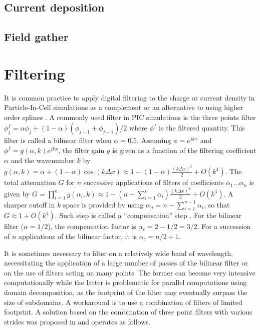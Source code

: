 \documentclass[]{report}
\begin{document}
\subsection{Current deposition}


\subsection{Field gather}


\section{Filtering}

It is common practice to apply digital filtering to the charge or
current density in Particle-In-Cell simulations as a complement or
an alternative to using higher order splines \cite{Birdsalllangdon}.
A commonly used filter in PIC simulations is the three points filter
$\phi_{j}^{f}=\alpha\phi_{j}+\left(1-\alpha\right)\left(\phi_{j-1}+\phi_{j+1}\right)/2$
where $\phi^{f}$ is the filtered quantity. This filter is called
a bilinear filter when $\alpha=0.5$. Assuming $\phi=e^{jkx}$ and
$\phi^{f}=g\left(\alpha,k\right)e^{jkx}$, the filter gain $g$ is
given as a function of the filtering coefficient $\alpha$ and
the wavenumber $k$ by $g\left(\alpha,k\right)=\alpha+\left(1-\alpha\right)\cos\left(k\Delta x\right)\approx1-\left(1-\alpha\right)\frac{\left(k\Delta x\right)^{2}}{2}+O\left(k^{4}\right)$.
The total attenuation $G$ for $n$ successive applications of filters
of coefficients $\alpha_{1}$...$\alpha_{n}$ is given by $G=\prod_{i=1}^{n}g\left(\alpha_{i},k\right)\approx1-\left(n-\sum_{i=1}^{n}\alpha_{i}\right)\frac{\left(k\Delta x\right)^{2}}{2}+O\left(k^{4}\right)$.
A sharper cutoff in $k$ space is provided by using $\alpha_{n}=n-\sum_{i=1}^{n-1}\alpha_{i}$,
so that $G\approx1+O\left(k^{4}\right)$. Such step is called a ``compensation''
step \cite{Birdsalllangdon}. For the bilinear filter ($\alpha=1/2$),
the compensation factor is $\alpha_{c}=2-1/2=3/2$. For a succession
of $n$ applications of the bilinear factor, it is $\alpha_{c}=n/2+1$.

It is sometimes necessary to filter on a relatively wide band of wavelength,
necessitating the application of a large number of passes of the bilinear
filter or on the use of filters acting on many points. The former
can become very intensive computationally while the latter is problematic
for parallel computations using domain decomposition, as the footprint
of the filter may eventually surpass the size of subdomains. A workaround
is to use a combination of filters of limited footprint. A solution
based on the combination of three point filters with various strides
was proposed in \cite{Vayjcp2011} and operates as follows.
\end{document}
